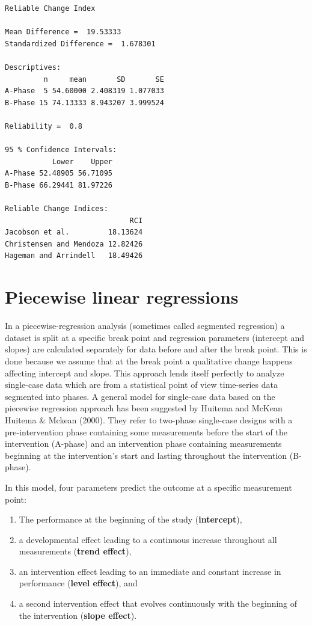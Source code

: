 \documentclass[
  letterpaper,
  DIV=11,
  numbers=noendperiod]{scrreprt}
\begin{document}
\begin{verbatim}
Reliable Change Index

Mean Difference =  19.53333 
Standardized Difference =  1.678301 

Descriptives:
         n     mean       SD       SE
A-Phase  5 54.60000 2.408319 1.077033
B-Phase 15 74.13333 8.943207 3.999524

Reliability =  0.8 

95 % Confidence Intervals:
           Lower    Upper
A-Phase 52.48905 56.71095
B-Phase 66.29441 81.97226

Reliable Change Indices:
                             RCI
Jacobson et al.         18.13624
Christensen and Mendoza 12.82426
Hageman and Arrindell   18.49426
\end{verbatim}

\hypertarget{piecewise-linear-regressions}{%
\chapter{Piecewise linear
regressions}\label{piecewise-linear-regressions}}

In a piecewise-regression analysis (sometimes called segmented
regression) a dataset is split at a specific break point and regression
parameters (intercept and slopes) are calculated separately for data
before and after the break point. This is done because we assume that at
the break point a qualitative change happens affecting intercept and
slope. This approach lends itself perfectly to analyze single-case data
which are from a statistical point of view time-series data segmented
into phases. A general model for single-case data based on the piecewise
regression approach has been suggested by Huitema and McKean Huitema \&
Mckean (2000). They refer to two-phase single-case designs with a
pre-intervention phase containing some measurements before the start of
the intervention (A-phase) and an intervention phase containing
measurements beginning at the intervention's start and lasting
throughout the intervention (B-phase).

In this model, four parameters predict the outcome at a specific
measurement point:

\begin{enumerate}
\def\labelenumi{\arabic{enumi}.}
\item
  The performance at the beginning of the study (\textbf{intercept}),
\item
  a developmental effect leading to a continuous increase throughout all
  measurements (\textbf{trend effect}),
\item
  an intervention effect leading to an immediate and constant increase
  in performance (\textbf{level effect}), and
\item
  a second intervention effect that evolves continuously with the
  beginning of the intervention (\textbf{slope effect}).
\end{enumerate}
\end{document}
